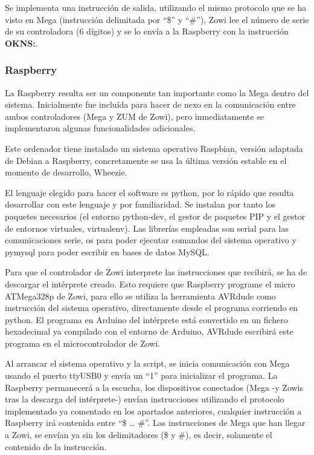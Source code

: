 Se implementa una instrucción de salida, utilizando el mismo protocolo que se ha visto en Mega (instrucción delimitada por ``\$'' y ``\#''), Zowi lee el número de serie de su controladora (6 dígitos) y se lo envía a la Raspberry con la instrucción \textbf{OKNS:}.

\subsubsection{Raspberry}

La Raspberry resulta ser un componente tan importante como la Mega dentro del sistema. Inicialmente fue incluída para hacer de nexo en la comunicación entre ambos controladores (Mega y ZUM de Zowi), pero inmediatamente se implementaron algunas funcionalidades adicionales.

Este ordenador tiene instalado un sistema operativo Raspbian, versión adaptada de Debian a Raspberry, concretamente se usa la última versión estable en el momento de desarrollo, Wheezie.

El lenguaje elegido para hacer el software es python, por lo rápido que resulta desarrollar con este lenguaje y por familiaridad. Se instalan por tanto los paquetes necesarios (el entorno python-dev, el gestor de paquetes PIP y el gestor de entornos virtuales, virtualenv). Las librerías empleadas son serial para las comunicaciones serie, os para poder ejecutar comandos del sistema operativo y pymysql para poder escribir en bases de datos MySQL.

Para que el controlador de Zowi interprete las instrucciones que recibirá, se ha de descargar el intérprete creado. Esto requiere que Raspberry programe el micro ATMega328p de Zowi, para ello se utiliza la herramienta AVRdude como instrucción del sistema operativo, directamente desde el programa corriendo en python.
El programa en Arduino del intérprete está convertido en un fichero hexadecimal ya compilado con el entorno de Arduino, AVRdude escribirá este programa en el microcontrolador de Zowi.

Al arrancar el sistema operativo y la script, se inicia comunicación con Mega usando el puerto ttyUSB0 y envía un “1” para inicializar el programa. La Raspberry permanecerá a la escucha, los dispositivos conectados (Mega -y Zowis tras la descarga del intérprete-) envían instrucciones utilizando el protocolo implementado ya comentado en los apartados anteriores, cualquier instrucción a Raspberry irá contenida entre “\$ … \#”. Las instrucciones de Mega que han llegar a Zowi, se envían ya sin los delimitadores (\$ y \#), es decir, solamente el contenido de la instrucción.

